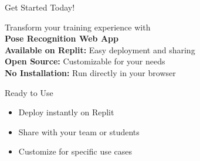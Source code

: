 \documentclass[11pt]{beamer}
\begin{document}
\begin{frame}{Get Started Today!}
    \begin{center}
        \Large Transform your training experience with\\
        \textbf{Pose Recognition Web App}\\
        \vspace{0.5cm}
        \normalsize
        \textbf{Available on Replit:} Easy deployment and sharing\\
        \textbf{Open Source:} Customizable for your needs\\
        \textbf{No Installation:} Run directly in your browser
    \end{center}
    \begin{block}{Ready to Use}
        \begin{itemize}
            \item Deploy instantly on Replit
            \item Share with your team or students
            \item Customize for specific use cases
        \end{itemize}
    \end{block}
\end{frame}
\end{document}
